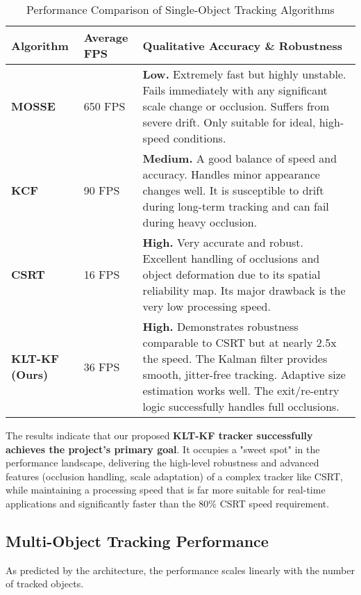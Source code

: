 \documentclass[12pt, a4paper]{article}
\begin{document}
\begin{table}[H]
    \centering
    \caption{Performance Comparison of Single-Object Tracking Algorithms}
    \label{tab:final_comparison}
    \begin{tabularx}{\textwidth}{@{}llX@{}}
        \toprule
        \textbf{Algorithm} & \textbf{Average FPS} & \textbf{Qualitative Accuracy \& Robustness} \\
        \midrule
        \textbf{MOSSE} & {}650 FPS & \textbf{Low.} Extremely fast but highly unstable. Fails immediately with any significant scale change or occlusion. Suffers from severe drift. Only suitable for ideal, high-speed conditions. \\
        \addlinespace
        \textbf{KCF} & {}90 FPS & \textbf{Medium.} A good balance of speed and accuracy. Handles minor appearance changes well. It is susceptible to drift during long-term tracking and can fail during heavy occlusion. \\
        \addlinespace
        \textbf{CSRT} & {}16 FPS & \textbf{High.} Very accurate and robust. Excellent handling of occlusions and object deformation due to its spatial reliability map. Its major drawback is the very low processing speed. \\
        \addlinespace
        \textbf{KLT-KF (Ours)} & {}36 FPS & \textbf{High.} Demonstrates robustness comparable to CSRT but at nearly 2.5x the speed. The Kalman filter provides smooth, jitter-free tracking. Adaptive size estimation works well. The exit/re-entry logic successfully handles full occlusions. \\
        \bottomrule
    \end{tabularx}
\end{table}

The results indicate that our proposed \textbf{KLT-KF tracker successfully achieves the project's primary goal}. It occupies a "sweet spot" in the performance landscape, delivering the high-level robustness and advanced features (occlusion handling, scale adaptation) of a complex tracker like CSRT, while maintaining a processing speed that is far more suitable for real-time applications and significantly faster than the 80\% CSRT speed requirement.

\subsection{Multi-Object Tracking Performance}
As predicted by the architecture, the performance scales linearly with the number of tracked objects.
\end{document}
